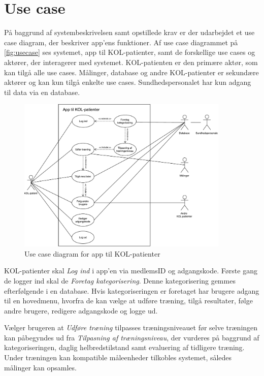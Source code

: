 \section{Use case} \label{sec:usecase} 
På baggrund af systembeskrivelsen samt opstillede krav er der udarbejdet et use case diagram, der beskriver app'ens funktioner. Af use case diagrammet på \autoref{fig:usecase} ses systemet, app til KOL-patienter, samt de forskellige use cases og aktører, der interagerer med systemet. KOL-patienten er den primære aktør, som kan tilgå alle use cases. Målinger, database og andre KOL-patienter er sekundære aktører og kan kun tilgå enkelte use cases. Sundhedspersonalet har kun adgang til data via en database. 

\begin{figure} [H]
\centering
\includegraphics[width=0.9\textwidth]{figures/aktivitetsdiagram/Usecase}
\caption{Use case diagram for app til KOL-patienter}
\label{fig:usecase}
\end{figure}

\noindent
KOL-patienter skal \textit{Log ind} i app'en via medlemsID og adgangskode. Første gang de logger ind skal de \textit{Foretag kategorisering}. Denne kategorisering gemmes efterfølgende i en database.
Hvis kategoriseringen er foretaget har brugere adgang til en hovedmenu, hvorfra de kan vælge at udføre træning, tilgå resultater, følge andre brugere, redigere adgangskode og logge ud. 

Vælger brugeren at \textit{Udføre træning} tilpasses træningsniveauet før selve træningen kan påbegyndes ud fra \textit{Tilpasning af træningsniveau}, der vurderes på baggrund af kategoriseringen, daglig helbredstilstand samt evaluering af tidligere træning. 
Under træningen kan kompatible måleenheder tilkobles systemet, således målinger kan opsamles. 

